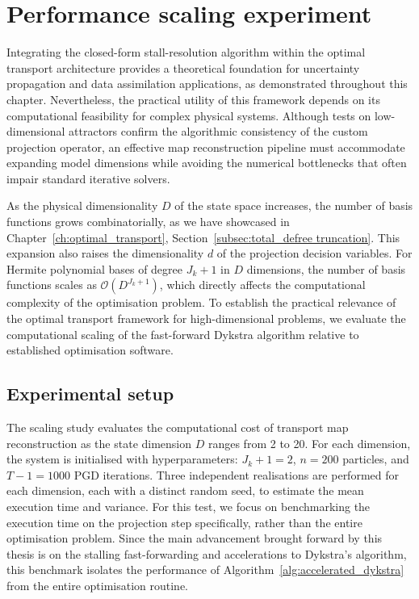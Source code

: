 \section{Performance scaling experiment} \label{sec:performance_scaling}

Integrating the closed-form stall-resolution algorithm within the optimal transport architecture provides a theoretical foundation for uncertainty propagation and data assimilation applications, as demonstrated throughout this chapter. Nevertheless, the practical utility of this framework depends on its computational feasibility for complex physical systems. Although tests on low-dimensional attractors confirm the algorithmic consistency of the custom projection operator, an effective map reconstruction pipeline must accommodate expanding model dimensions while avoiding the numerical bottlenecks that often impair standard iterative solvers.

As the physical dimensionality $D$ of the state space increases, the number of basis functions grows combinatorially, as we have showcased in Chapter~\ref{ch:optimal_transport}, Section~\ref{subsec:total_defree truncation}. This expansion also raises the dimensionality $d$ of the projection decision variables. For Hermite polynomial bases of degree $J_k+1$ in $D$ dimensions, the number of basis functions scales as $\mathcal{O}(D^{J_k+1})$, which directly affects the computational complexity of the optimisation problem. To establish the practical relevance of the optimal transport framework for high-dimensional problems, we evaluate the computational scaling of the fast-forward Dykstra algorithm relative to established optimisation software.

\subsection{Experimental setup} \label{sec:scaling_setup}

The scaling study evaluates the computational cost of transport map reconstruction as the state dimension $D$ ranges from 2 to 20. For each dimension, the system is initialised with hyperparameters: $J_k+1 = 2$, $n = 200$ particles, and $T-1 = 1000$ PGD iterations. Three independent realisations are performed for each dimension, each with a distinct random seed, to estimate the mean execution time and variance. For this test, we focus on benchmarking the execution time on the projection step specifically, rather than the entire optimisation problem. Since the main advancement brought forward by this thesis is on the stalling fast-forwarding and accelerations to Dykstra's algorithm, this benchmark isolates the performance of Algorithm~\ref{alg:accelerated_dykstra} from the entire optimisation routine.

